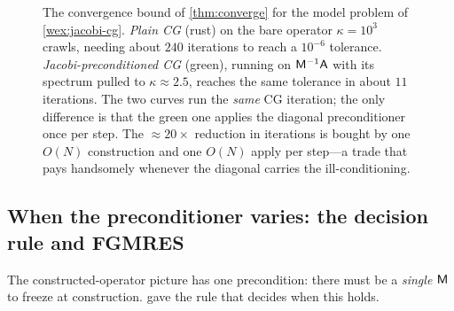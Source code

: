 \begin{figure}[t]
\centering
{}
\caption[Jacobi-preconditioned CG versus plain CG]{The convergence bound of
\cref{thm:converge} for the model problem of \cref{wex:jacobi-cg}. \emph{Plain CG} (rust)
on the bare operator $\kappa=10^3$ crawls, needing about $240$ iterations to reach a
$10^{-6}$ tolerance. \emph{Jacobi-preconditioned CG} (green), running on
$\mathsf{M}^{-1}\mathsf{A}$ with its spectrum pulled to $\kappa\approx2.5$, reaches the same
tolerance in about $11$ iterations. The two curves run the \emph{same} CG iteration; the
only difference is that the green one applies the diagonal preconditioner once per step.
The $\approx20\times$ reduction in iterations is bought by one $O(N)$ construction and one
$O(N)$ apply per step---a trade that pays handsomely whenever the diagonal carries the
ill-conditioning.}
\label{fig:jacobi-conv}
\end{figure}

\subsection{When the preconditioner varies: the decision rule and FGMRES}
\label{sec:flexible}

The constructed-operator picture has one precondition: there must be a \emph{single}
$\mathsf{M}$ to freeze at construction.  gave the rule that decides when
this holds.

